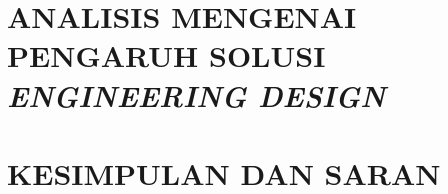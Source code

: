 \documentclass{DTETI_CP_C501}
\begin{document}
\chapter{\texorpdfstring{\uppercase{Analisis Mengenai Pengaruh Solusi \textit{Engineering Design} }}{ANALISIS MENGENAI PENGARUH SOLUSI ENGINEERING DESIGN}}
\label{chap:Impact_Engineering}


\chapter{\texorpdfstring{\uppercase{Kesimpulan dan Saran}}{KESIMPULAN DAN SARAN}}
\label{chap:Kesimpulan_Saran}



\begin{thebibliography}{}

    

\end{thebibliography}

\end{document}

